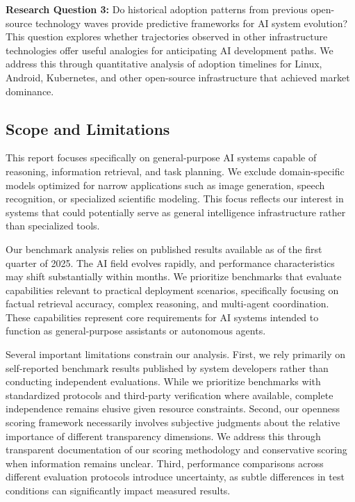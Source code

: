 \textbf{Research Question 3:} Do historical adoption patterns from previous open-source technology waves provide predictive frameworks for AI system evolution? This question explores whether trajectories observed in other infrastructure technologies offer useful analogies for anticipating AI development paths. We address this through quantitative analysis of adoption timelines for Linux, Android, Kubernetes, and other open-source infrastructure that achieved market dominance.

\subsection{Scope and Limitations}

This report focuses specifically on general-purpose AI systems capable of reasoning, information retrieval, and task planning. We exclude domain-specific models optimized for narrow applications such as image generation, speech recognition, or specialized scientific modeling. This focus reflects our interest in systems that could potentially serve as general intelligence infrastructure rather than specialized tools.

Our benchmark analysis relies on published results available as of the first quarter of 2025. The AI field evolves rapidly, and performance characteristics may shift substantially within months. We prioritize benchmarks that evaluate capabilities relevant to practical deployment scenarios, specifically focusing on factual retrieval accuracy, complex reasoning, and multi-agent coordination. These capabilities represent core requirements for AI systems intended to function as general-purpose assistants or autonomous agents.

Several important limitations constrain our analysis. First, we rely primarily on self-reported benchmark results published by system developers rather than conducting independent evaluations. While we prioritize benchmarks with standardized protocols and third-party verification where available, complete independence remains elusive given resource constraints. Second, our openness scoring framework necessarily involves subjective judgments about the relative importance of different transparency dimensions. We address this through transparent documentation of our scoring methodology and conservative scoring when information remains unclear. Third, performance comparisons across different evaluation protocols introduce uncertainty, as subtle differences in test conditions can significantly impact measured results.


